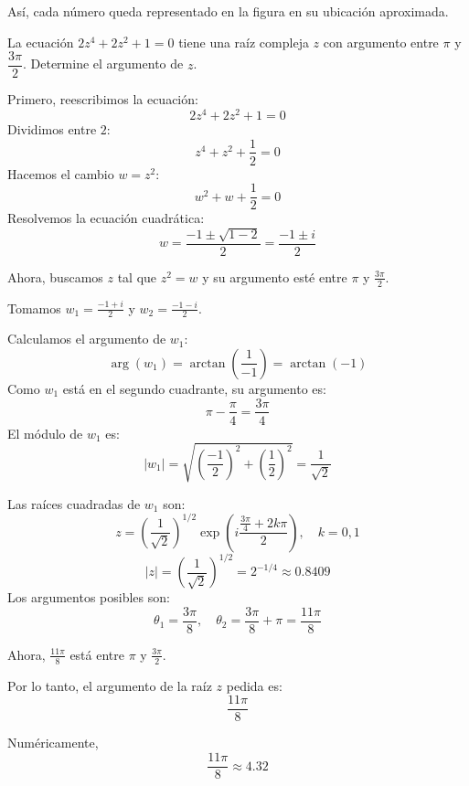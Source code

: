 \begin{prob}
\begin{myproof}
\begin{center}
\end{center}

Así, cada número queda representado en la figura en su ubicación aproximada.
\end{myproof}

\end{prob}
	
\begin{prob} La ecuación $2z^4+2z^2+1=0$ tiene una raíz compleja $z$ con argumento entre $\pi$ y $\dfrac{3\pi}{2}$. Determine el argumento de $z$.
\begin{myproof}
Primero, reescribimos la ecuación:
\[
2z^4 + 2z^2 + 1 = 0
\]
Dividimos entre $2$:
\[
z^4 + z^2 + \frac{1}{2} = 0
\]
Hacemos el cambio $w = z^2$:
\[
w^2 + w + \frac{1}{2} = 0
\]
Resolvemos la ecuación cuadrática:
\[
w = \frac{-1 \pm \sqrt{1 - 2}}{2} = \frac{-1 \pm i}{2}
\]

Ahora, buscamos $z$ tal que $z^2 = w$ y su argumento esté entre $\pi$ y $\frac{3\pi}{2}$.

Tomamos $w_1 = \frac{-1 + i}{2}$ y $w_2 = \frac{-1 - i}{2}$.

Calculamos el argumento de $w_1$:
\[
\arg(w_1) = \arctan\left(\frac{1}{-1}\right) = \arctan(-1)
\]
Como $w_1$ está en el segundo cuadrante, su argumento es:
\[
\pi - \frac{\pi}{4} = \frac{3\pi}{4}
\]
El módulo de $w_1$ es:
\[
|w_1| = \sqrt{\left(\frac{-1}{2}\right)^2 + \left(\frac{1}{2}\right)^2} = \frac{1}{\sqrt{2}}
\]

Las raíces cuadradas de $w_1$ son:
\[
z = \left(\frac{1}{\sqrt{2}}\right)^{1/2} \exp\left(i \frac{\frac{3\pi}{4} + 2k\pi}{2}\right), \quad k=0,1
\]
\[
|z| = \left(\frac{1}{\sqrt{2}}\right)^{1/2} = 2^{-1/4} \approx 0.8409
\]
Los argumentos posibles son:
\[
\theta_1 = \frac{3\pi}{8}, \quad \theta_2 = \frac{3\pi}{8} + \pi = \frac{11\pi}{8}
\]

Ahora, $\frac{11\pi}{8}$ está entre $\pi$ y $\frac{3\pi}{2}$.

Por lo tanto, el argumento de la raíz $z$ pedida es:
\[
\boxed{\frac{11\pi}{8}}
\]

Numéricamente,
\[
\frac{11\pi}{8} \approx 4.32
\]
\end{myproof}

\end{prob}		

